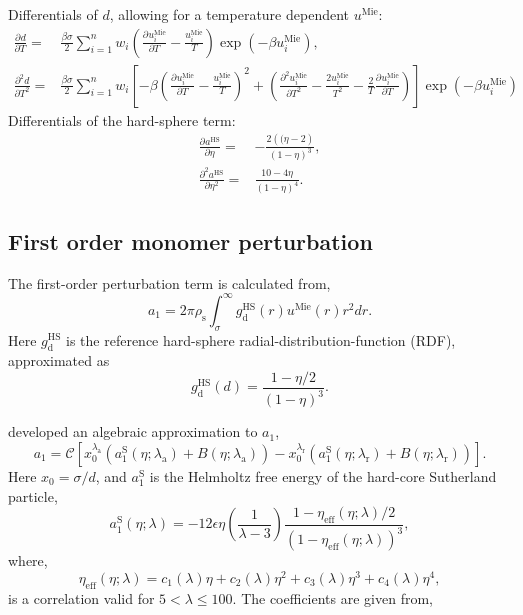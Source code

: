 \documentclass[english]{../thermomemo/thermomemo}
\newcommand*{\pd}[3][]{\frac{\partial^{#1}#2}{\partial{#3}^{#1}}}%
\newcommand*{\lb}{\left(}
\newcommand*{\rb}{\right)}
\newcommand{\mie}{\text{Mie}\xspace}
\newcommand{\hs}{\text{HS}\xspace}
\newcommand{\seg}{\ensuremath{\text{s}}\xspace}
\newcommand{\lama}{\ensuremath{{\lambda_{\text{a}}}}\xspace}
\newcommand{\lamr}{\ensuremath{{\lambda_{\text{r}}}}\xspace}
\newcommand{\gdhs}{\ensuremath{g_{\text{d}}^\hs}\xspace}
\newcommand{\aS}{\ensuremath{a_{1}^{\text{S}}}\xspace}
\newcommand{\eff}{\ensuremath{\text{eff}}\xspace}
\begin{document}
Differentials of $d$, allowing for a temperature dependent $u^\mie$:
\begin{align}
  \label{eq:d_diff}
  \pd{d}{T} =& \frac{\beta\sigma}{2} \sum_{i=1}^n w_i  \lb \pd{u^\mie_i}{T} - \frac{u^\mie_i}{T}\rb \exp\lb-\beta u^\mie_i \rb,\\
  \pd[2]{d}{T} =& \frac{\beta\sigma}{2} \sum_{i=1}^n w_i \left[ -\beta\lb \pd{u^\mie_i}{T} - \frac{u^\mie_i}{T}\rb^2 +  \lb \pd[2]{u^\mie_i}{T} - \frac{2u^\mie_i}{T^2}- \frac{2}{T} \pd{u^\mie_i}{T}\rb \right]\exp\lb-\beta u^\mie_i \rb
\end{align}
Differentials of the hard-sphere term:
\begin{align}
  \label{eq:a_hs_diff}
  \pd{a^\hs}{\eta} =& -\frac{2 \lb( \eta - 2\rb}{\lb 1-\eta\rb^3},\\
  \pd[2]{a^\hs}{\eta} =& \frac{10 - 4 \eta}{\lb 1-\eta\rb^4}.
\end{align}

\subsection{First order monomer perturbation}
The first-order perturbation term is calculated from,
\begin{equation}
  \label{eq:a_1}
  a_1 = 2 \pi \rho_\seg \int_\sigma^\infty \gdhs \lb r \rb u^\mie\lb r\rb  r^2 dr.
\end{equation}
Here $\gdhs$ is the reference hard-sphere radial-distribution-function
(RDF), approximated as
\begin{equation}
  \label{eq:gdhs}
  \gdhs \lb d \rb = \frac{1 - \eta/2}{\lb 1 - \eta \rb^3}.
\end{equation}

\citet{Lafitte2013} developed an algebraic approximation to $a_1$,
\begin{equation}
  \label{eq:a_1_approx}
  a_1 = \mathcal{C} \left[ x_0^\lama \lb \aS \lb \eta; \lama \rb + B \lb \eta; \lama \rb  \rb - x_0^\lamr \lb \aS \lb \eta; \lamr \rb + B \lb \eta; \lamr \rb  \rb\right].
\end{equation}
Here $x_0 = \sigma/d$, and $\aS$ is the Helmholtz free energy of the
hard-core Sutherland particle,
\begin{equation}
  \label{eq:a_1_S}
  \aS\lb \eta; \lambda \rb = -12 \epsilon \eta \lb \frac{1}{\lambda - 3} \rb \frac{1 - \eta_\eff\lb \eta; \lambda \rb / 2}{\lb 1 - \eta_\eff\lb \eta; \lambda \rb \rb^3},
\end{equation}
where,
\begin{equation}
  \label{eq:eta_eff}
  \eta_\eff\lb \eta; \lambda \rb = c_1 \lb \lambda \rb \eta + c_2 \lb \lambda \rb \eta^2 + c_3 \lb \lambda \rb \eta^3 + c_4 \lb \lambda \rb \eta^4,
\end{equation}
is a correlation valid for $ 5 < \lambda \leq 100$. The coefficients are given from,
\end{document}
